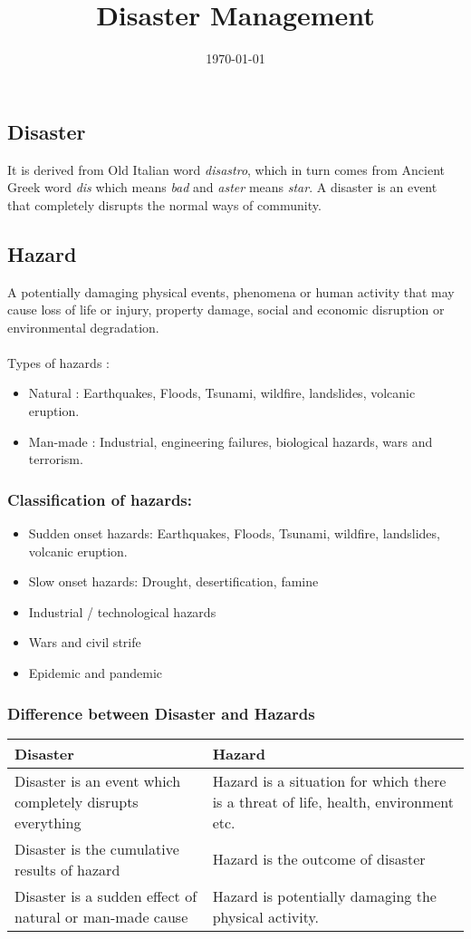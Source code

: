 \documentclass[12pt,a4paper]{article}
\title{Disaster Management\vspace{-2em}}
\date{\today}
\begin{document}
  \maketitle
  
\subsection*{Disaster}
It is derived from Old Italian word \textit{disastro}, which in turn comes from Ancient Greek word \textit{dis} which means \textit{bad} and \textit{aster} means \textit{star}. A disaster is an event that completely disrupts the normal ways of community.

\subsection*{Hazard}  
A potentially damaging physical events, phenomena or human activity that may cause loss of life or injury, property damage, social and economic disruption or environmental degradation. 
\\
\\
Types of hazards :
\begin{itemize}
	\item Natural : Earthquakes, Floods, Tsunami, wildfire, landslides, volcanic eruption.
	\item Man-made : Industrial, engineering failures, biological hazards, wars and terrorism.
\end{itemize}
\subsubsection*{Classification of hazards:} 
\begin{itemize}
	\item Sudden onset hazards: Earthquakes, Floods, Tsunami, wildfire, landslides, volcanic eruption.
	\item Slow onset hazards: Drought, desertification, famine 
	\item Industrial / technological hazards 
	\item Wars and civil strife
	\item Epidemic and pandemic
\end{itemize}

\subsubsection*{Difference between Disaster and Hazards}
\begin{center}
	\begin{tabular}{ p{60mm}|p{60mm} }
		\hline
		\textbf{Disaster} &  \textbf{Hazard} \\
		\hline
		Disaster is an event which completely disrupts everything & 
		Hazard is a situation for which there is a threat of life, health, environment etc. \\ 
		Disaster is the cumulative results of hazard & Hazard is the outcome of disaster \\  
		Disaster is a sudden effect of natural or man-made cause & Hazard is potentially damaging the physical activity.   
	\end{tabular}
\end{center}
\end{document}
